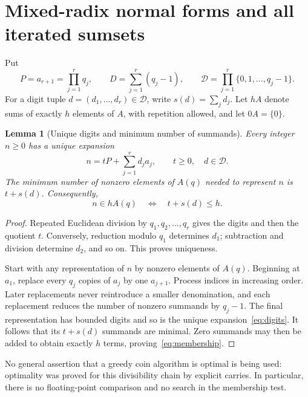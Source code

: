 \documentclass[11pt]{article}
\numberwithin{equation}{section}
\newtheorem{lemma}[theorem]{Lemma}
\theoremstyle{definition}
\theoremstyle{remark}\newtheorem{remark}[theorem]{Remark}
\begin{document}
\section{Mixed-radix normal forms and all iterated sumsets}
\label{sec:normal}

Put
\begin{equation}\label{eq:PD}
 P=a_{r+1}=\prod_{j=1}^r q_j,\qquad
 D=\sum_{j=1}^r(q_j-1),\qquad
 \mathcal D=\prod_{j=1}^r\{0,1,\ldots,q_j-1\}.
\end{equation}
For a digit tuple $d=(d_1,\ldots,d_r)\in\mathcal D$, write
$s(d)=\sum_jd_j$.  Let $hA$ denote sums of exactly $h$ elements of $A$,
with repetition allowed, and let $0A=\{0\}$.

\begin{lemma}[Unique digits and minimum number of summands]
\label{lem:normal}
Every integer $n\ge0$ has a unique expansion
\begin{equation}\label{eq:digits}
 n=tP+\sum_{j=1}^r d_j a_j,
 \qquad t\ge0,\quad d\in\mathcal D.
\end{equation}
The minimum number of nonzero elements of $A(q)$ needed to represent $n$
is $t+s(d)$.  Consequently,
\begin{equation}\label{eq:membership}
 n\in hA(q)\quad\Longleftrightarrow\quad t+s(d)\le h.
\end{equation}
\end{lemma}
\begin{proof}
Repeated Euclidean division by $q_1,q_2,\ldots,q_r$ gives the digits and
then the quotient $t$.  Conversely, reduction modulo $q_1$ determines $d_1$;
subtraction and division determine $d_2$, and so on.  This proves uniqueness.

Start with any representation of $n$ by nonzero elements of $A(q)$.
Beginning at $a_1$, replace every $q_j$ copies of $a_j$ by one $a_{j+1}$.
Process indices in increasing order.  Later replacements never reintroduce
a smaller denomination, and each replacement reduces the number of nonzero
summands by $q_j-1$.  The final representation has bounded digits and so is
the unique expansion~\eqref{eq:digits}.  It follows that its $t+s(d)$
summands are minimal.  Zero summands may then be added to obtain exactly
$h$ terms, proving~\eqref{eq:membership}.
\end{proof}

No general assertion that a greedy coin algorithm is optimal is being
used: optimality was proved for this divisibility chain by explicit carries.
In particular, there is no floating-point comparison and no search in the
membership test.
\end{document}
